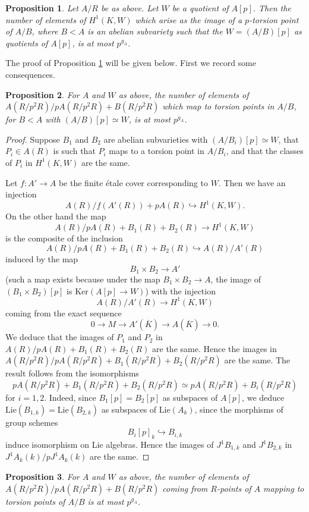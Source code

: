 \documentclass[11pt]{amsart}
\newcommand{\Lie}{\mathrm{Lie}}
\newcommand{\Ker}{\mathrm{Ker}}
\theoremstyle{plain}
\newtheorem{proposition}{Proposition}
\theoremstyle{definition}
\begin{document}
\begin{proposition}\label{prop:kummer}
Let $A/R$ be as above. Let $W$ be a quotient of $A[p]$. Then the number of elements of $H^1 (K,W)$ which arise as the image of a $p$-torsion point of $A/B$, where $B<A$ is an abelian subvariety such that the $W=(A/B)[p]$ as quotients of $A[p]$, is at most $p^{g_A}$.
\end{proposition}
The proof of Proposition \ref{prop:kummer} will be given below. First we record some consequences.
\begin{proposition}\label{prop:finite_2}
For $A$ and $W$ as above, the number of elements of $A(R/p^2 R)/pA(R/p^2 R)+B(R/p^2 R)$ which map to torsion points in $A/B$, for $B<A$ with $(A/B)[p]\simeq W$, is at most $p^{g_A}$.
\end{proposition}
\begin{proof}
Suppose $B_1 $ and $B_2 $ are abelian subvarieties with $(A/B_i )[p]\simeq W$, that $P_i \in A(R)$ is such that $P_i$ maps to a torsion point in $A/B_i$, and that the classes of $P_i$ in $H^1 (K,W)$ are the same.

Let $f:A'\to A$ be the finite \'etale cover corresponding to $W$. Then we have an injection
\[
A(R)/f(A'(R))+pA(R)\hookrightarrow H^1 (K,W).
\]
On the other hand the map
\[
A(R)/pA(R)+B_1 (R)+B_2 (R) \to H^1 (K,W)
\]
is the composite of the inclusion
\[
A(R)/pA(R)+B_1 (R)+B_2 (R) \hookrightarrow A(R)/A'(R)
\]
induced by the map
\[
B_1 \times B_2 \to A'
\]
(such a map exists because under the map $B_1 \times B_2 \to A$, the image of $(B_1 \times B_2 )[p]$ is $\Ker (A[p]\to W)$) with the injection
\[
A(R)/A'(R)\to H^1 (K,W)
\]
coming from the exact sequence
\[
0\to M\to A' (\overline{K})\to A(\overline{K})\to 0.
\]
We deduce that the images of $P_1$ and $P_2 $ in $A(R)/pA(R)+B_1 (R)+B_2 (R)$ are the same. Hence the images in $A(R/p^2 R)/pA(R/p^2 R)+B_1 (R/p^2 R)+B_2 (R/p^2 R)$ are the same. The result follows from the isomorphisms
\[
pA(R/p^2 R)+B_1 (R/p^2 R)+B_2 (R/p^2 R)\simeq pA(R/p^2 R)+B_i (R/p^2 R)
\]
for $i=1,2$. Indeed, since $B_1 [p]=B_2 [p]$ as subspaces of $A[p]$, we deduce $\Lie (B_{1,k})=\Lie (B_{2,k})$ as subspaces of $\Lie (A_k )$, since the morphisms of group schemes
\[
B_i [p]_k \hookrightarrow B_{i,k}
\]
induce isomorphism on Lie algebras. Hence the images of $J^1 B_{1,k}$ and $J^1 B_{2,k}$ in $J^1 A_k (k)/pJ^1 A_k (k)$ are the same.
\end{proof}
\begin{proposition}
For $A$ and $W$ as above, the number of elements of $A(R/p^2 R)/pA(R/p^2 R)+B(R/p^2 R)$ coming from $R$-points of $A$ mapping to torsion points of $A/B$ is at most $p^{g_A}$.
\end{proposition}
\end{document}

